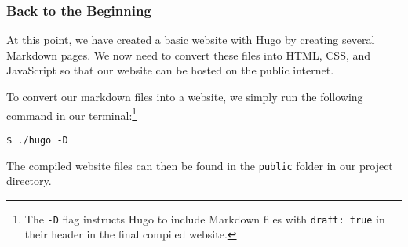 \begin{frame}[fragile]
    \frametitle{Back to the Beginning}

    At this point, we have created a basic website with Hugo by creating several Markdown pages. We now need to convert
    these files into HTML, CSS, and JavaScript so that our website can be hosted on the public internet.

    \bigskip

    To convert our markdown files into a website, we simply run the following command in our terminal:\footnote{
        The \texttt{-D} flag instructs Hugo to include Markdown files with \texttt{draft: true} in their header in
        the final compiled website.
    }

    \smallskip

    \begin{lstlisting}[style=saneCode,gobble=8]
        $ ./hugo -D
    \end{lstlisting}

    \bigskip
    The compiled website files can then be found in the \texttt{public} folder in our project directory.
\end{frame}